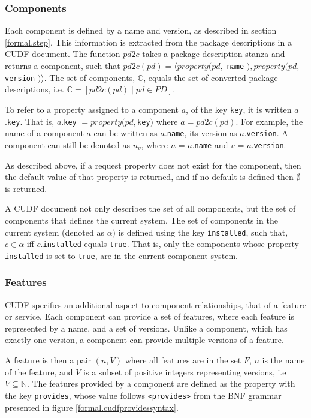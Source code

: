 \subsubsection{Components}
Each component is defined by a name and version, as described in section \ref{formal.step}.
This information is extracted from the package descriptions in a CUDF document.
The function $pd2c$ takes a package description stanza and returns a component, such that $pd2c(pd) = \langle property(pd, $ \verb+name+ $), property(pd, $ \verb+version+ $) \rangle$.
The set of components, $\mathbb{C}$, equals the set of converted package descriptions, i.e. $\mathbb{C} = [ pd2c(pd) \mid pd \in PD]$.

To refer to a property assigned to a component $a$, of the key \verb+key+, it is written $a$.\verb+key+.
That is, $a$.\verb+key+ $= property(pd, $\verb+key+$)$ where $a = pd2c(pd)$.
For example, the name of a component $a$ can be written as $a$.\verb+name+, its version as $a$.\verb+version+.
A component can still be denoted as $n_v$, where $n$ = $a$.\verb+name+ and $v$ = $a$.\verb+version+.

As described above, 
if a request property does not exist for the component, then the default value of that property is returned, and if no default is defined then $\emptyset$ is returned.

A CUDF document not only describes the set of all components, but the set of components that defines the current system.
The set of components in the current system (denoted as $\alpha$) is defined using the key \verb+installed+,
such that, $c \in \alpha$ iff  $c.$\verb+installed+ equals \verb+true+.
That is, only the components whose property \verb+installed+ is set to \verb+true+, are in the current component system.

\subsubsection{Features}
CUDF specifies an additional aspect to component relationships, that of a feature or service.
Each component can provide a set of features, where each feature is represented by a name, and a set of versions.
Unlike a component, which has exactly one version, a component can provide multiple versions of a feature.

A feature is then a pair $(n,V)$ where all features are in the set $F$, $n$ is the name of the feature, and $V$ is a subset of positive integers representing versions, i.e $V \subseteq \mathbb{N}$.
The features provided by a component are defined as the property with the key \verb+provides+, 
whose value follows \verb+<provides>+ from the BNF grammar presented in figure \ref{formal.cudfprovidessyntax}.

